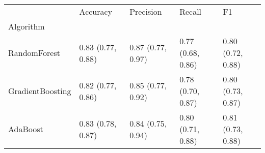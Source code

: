 \begin{tabular}{lllll}
\toprule
{} &           Accuracy &          Precision &             Recall &                 F1 \\
Algorithm        &                    &                    &                    &                    \\
\midrule
RandomForest     &  0.83 (0.77, 0.88) &  0.87 (0.77, 0.97) &  0.77 (0.68, 0.86) &  0.80 (0.72, 0.88) \\
GradientBoosting &  0.82 (0.77, 0.86) &  0.85 (0.77, 0.92) &  0.78 (0.70, 0.87) &  0.80 (0.73, 0.87) \\
AdaBoost         &  0.83 (0.78, 0.87) &  0.84 (0.75, 0.94) &  0.80 (0.71, 0.88) &  0.81 (0.73, 0.88) \\
\bottomrule
\end{tabular}
